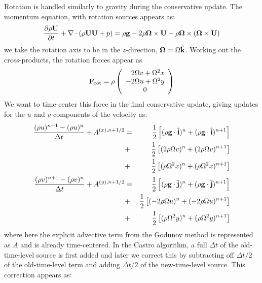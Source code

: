 \documentclass[12pt,preprint]{aastex}
\begin{document}
Rotation is handled similarly to gravity during the conservative update.
The momentum equation, with rotation sources appears as:
\begin{equation}
\frac{\partial \rho {\bf U}}{\partial t} + \nabla \cdot (\rho {\bf U U} + p) = 
   \rho {\bf g} - 2 \rho {\bf \Omega \times U} 
                - \rho {\bf \Omega \times (\Omega \times U)}
\end{equation}
we take the rotation axis to be in the $z$-direction, ${\bf \Omega} =
\Omega \hat{\bf k}$.  Working out the cross-products, the rotation
forces appear as
\begin{equation}
{\bf F}_\mathrm{rot} = \rho \left (
    \begin{array}{c}
     \phantom{-}2 \Omega v + \Omega^2 x \\
              - 2 \Omega u + \Omega^2 y \\
              0 
    \end{array}
  \right )
\end{equation}
We want to time-center this force in the final conservative update, giving
updates for the $u$ and $v$ components of the velocity as:
\begin{eqnarray}
\frac{(\rho u)^{n+1} - (\rho u)^n}{\Delta t} + A^{(x),n+1/2} &=&
   \frac{1}{2} \left [ (\rho {\bf g}\cdot \hat{\bf i})^n
                      + (\rho {\bf g}\cdot \hat{\bf i})^{n+1} \right ] \nonumber\\&+&
   \frac{1}{2} \left [ (2\rho \Omega v)^n + (2\rho \Omega v)^{n+1} \right ] \nonumber \\&+&
   \frac{1}{2} \left [ (\rho \Omega^2 x)^n + (\rho \Omega^2 x)^{n+1} \right ] \\
\frac{(\rho v)^{n+1} - (\rho v)^n}{\Delta t} + A^{(y),n+1/2} &=&
   \frac{1}{2} \left [ (\rho {\bf g}\cdot \hat{\bf j})^n +
                       (\rho {\bf g}\cdot \hat{\bf j})^{n+1} \right ] \nonumber \\ &+&
   \frac{1}{2} \left [ (-2\rho \Omega u)^n + (-2\rho \Omega u)^{n+1} \right ] \nonumber \\ &+&
   \frac{1}{2} \left [ (\rho \Omega^2 y)^n + (\rho \Omega^2 y)^{n+1} \right ]
\end{eqnarray}
where here the explicit advective term from the Godunov method is represented as $A$ and is already time-centered.  In the Castro algorithm, a full $\Delta t$ of the old-time-level source is first added and later we correct this by subtracting off $\Delta t/2$ of the old-time-level term and adding $\Delta t/2$ of the new-time-level source.  This correction appears as:
\end{document}
